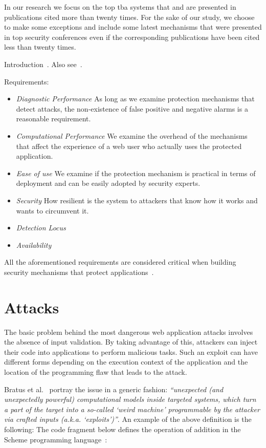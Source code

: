 \documentclass[conference]{IEEEtran}
\begin{document}
In our research we focus on the top
{\sc tba} systems that and are presented
in publications cited more than twenty times.
For the sake of our study, we choose
to make some exceptions and include some latest mechanisms
that were presented in top security conferences even if
the corresponding publications have been cited less than
twenty times.


Introduction~\cite{I05}. Also see~\cite{A00}.

Requirements:
\begin{itemize}
\item {\it Diagnostic Performance} As long
as we examine protection mechanisms that detect
attacks, the non-existence of false positive and
negative alarms is a reasonable requirement.
\item {\it Computational Performance} We examine
the overhead of the mechanisms
that affect the experience of a web user who actually
uses the protected application.
\item {\it Ease of use} We examine if the protection
mechanism is practical in terms of deployment
and can be easily adopted by security experts.
\item {\it Security} How resilient is the system to
attackers that know how it works and wants to circumvent it.
\item {\it Detection Locus}
\item {\it Availability}
\end{itemize}

All the aforementioned requirements are considered critical
when building security mechanisms that protect
applications~\cite{A01,A00}.

\section{Attacks}
\label{sec:attacks}

The basic problem behind the most dangerous
web application attacks involves
the absence of input validation. By taking advantage of
this, attackers can inject their code into
applications to perform malicious tasks. Such
an exploit can have different forms depending on the
execution context of the application and the location
of the programming flaw that leads to the attack.

Bratus et al.~\cite{BLSPS11} portray the issue in a generic fashion:
{\it ``unexpected (and unexpectedly powerful) computational models
inside targeted systems, which turn a part of the target into a
so-called `weird machine' programmable by the attacker via crafted inputs
(a.k.a. `exploits')''}.
An example of the above definition is the
following: The code fragment below defines the operation of
addition in the Scheme programming language~\cite{AS96,D09}:
\end{document}
